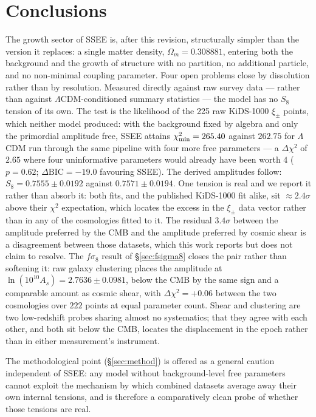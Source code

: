 \documentclass[12pt,a4paper]{article}
\newcommand{\SSEE}{\textsc{SSEE}}
\begin{document}
\section{Conclusions}

The growth sector of \SSEE{} is, after this revision, structurally simpler
than the version it replaces: a single matter density, $\Omega_m=0.308881$,
entering both the background and the growth of structure with no partition,
no additional particle, and no non-minimal coupling parameter. Four open
problems close by dissolution rather than by resolution. Measured directly
against raw survey data --- rather than against $\Lambda$CDM-conditioned
summary statistics --- the model has no $S_8$ tension of its own. The test is
the likelihood of the 225 raw KiDS-1000 $\xi_\pm$ points, which neither model
produced: with the background fixed by algebra and only the primordial
amplitude free, \SSEE{} attains $\chi^2_{\rm min}=265.40$ against $262.75$ for
$\Lambda$CDM run through the same pipeline with four more free parameters ---
a $\Delta\chi^2$ of $2.65$ where four uninformative parameters would already
have been worth $4$ ($p=0.62$; $\Delta\mathrm{BIC}=-19.0$ favouring \SSEE{}).
The derived amplitudes follow: $S_8=0.7555\pm0.0192$ against
$0.7571\pm0.0194$. One tension is real and we report it rather than absorb it:
both fits, and the published KiDS-1000 fit alike, sit $\approx2.4\sigma$ above
their $\chi^2$ expectation, which locates the excess in the $\xi_\pm$ data
vector rather than in any of the cosmologies fitted to it. The residual
$3.4\sigma$ between the amplitude preferred by the CMB and
the amplitude preferred by cosmic shear is a disagreement between those
datasets, which this work reports but does not claim to resolve. The
$f\sigma_8$ result of \S\ref{sec:fsigma8} closes the pair rather than
softening it: raw galaxy clustering places the amplitude at
$\ln(10^{10}A_s)=2.7636\pm0.0981$, below the CMB by the same sign and a
comparable amount as cosmic shear, with $\Delta\chi^2=+0.06$ between the two
cosmologies over $222$ points at equal parameter count. Shear and clustering
are two low-redshift probes sharing almost no systematics; that they agree
with each other, and both sit below the CMB, locates the displacement in the
epoch rather than in either measurement's instrument.

The methodological point (\S\ref{sec:method}) is offered as a general caution
independent of \SSEE{}: any model without background-level free parameters
cannot exploit the mechanism by which combined datasets average away their own
internal tensions, and is therefore a comparatively clean probe of whether
those tensions are real.

\clearpage


\end{document}
